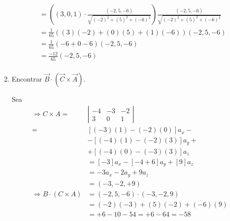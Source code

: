 \begin{problema}
\begin{enumerate}
\begin{sol}
$$\begin{aligned}
& =\left((3,0,1) \cdot \frac{(-2,5,-6)}{\sqrt{(-2)^2+(5)^2+(-6)^2}}\right) \frac{(-2,5,-6)}{\sqrt{(-2)^2+(5)^2+(-6)^2}} \\
& =\frac{1}{65}\left((3)(-2)+(0)(5)+(1)(-6)\right)(-2,5,-6) \\
& =\frac{1}{65}(-6+0-6)(-2,5,-6) \\
& =\frac{-12}{65}(-2,5,-6) \\
&
\end{aligned}
$$
    \end{sol}
    \item Encontrar $\vec{B} \cdot(\vec{C} \times \vec{A})$.
    \begin{sol}
        Sea
        $$
\begin{aligned}
\Rightarrow C \times A= & \left|\begin{array}{ccc}
-4 & -3 & -2 \\
3 & 0 & 1
\end{array}\right| \\
= & {[(-3)(1)-(-2)(0)] a_x }- \\
& -[(-4)(1)-(-2)(3)] a_y+ \\
& +[(-4)(0)-(-3)(3)] a_z \\
& =[-3] a_x-[-4+6] a_y+[9] a_z \\
& =-3 a_x-2 a_y+9 a_z \\
& =(-3,-2,+9) \\
\Rightarrow B \cdot(C \times A) & =(-2,5,-6) \cdot(-3,-2,9) \\
& =(-2)(-3)+(5)(-2)+(-6)(9) \\
& =+6-10-54=+6-64=-58
\end{aligned}
$$
    \end{sol}
\end{enumerate}


\end{problema}

